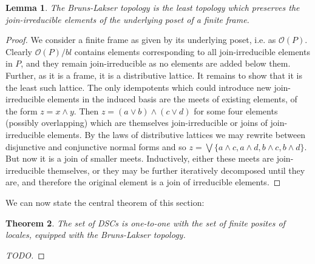 \documentclass[hoptionsi,review,format=acmsmall]{acmart}
\newtheorem{theorem}{Theorem}[section]
\newtheorem{lemma}[theorem]{Lemma}
\theoremstyle{definition}
\newcommand{\Oc}{\mathcal{O}}
\begin{document}
\begin{lemma}
The Bruns-Lakser topology is the least topology which preserves the join-irreducible elements of the underlying poset of a finite frame.
\end{lemma}
\begin{proof}
We consider a finite frame as given by its underlying poset, i.e. as \(\Oc(P)\). Clearly \(\Oc(P)/bl\) contains elements corresponding to all join-irreducible elements in \(P\), and they remain join-irreducible as no elements are added below them. Further, as it is a frame, it is a distributive lattice. It remains to show that it is the least such lattice. The only idempotents which could introduce new join-irreducible elements in the induced basis are the meets of existing elements, of the form  \(z = x \wedge y\). Then \(z = (a \vee b) \wedge (c \vee d)\) for some four elements (possibly overlapping) which are themselves join-irreducible or joins of join-irreducible elements.  By the laws of distributive lattices we may rewrite between disjunctive and conjunctive normal forms and so \(z = \bigvee \{a \wedge c, a \wedge d, b \wedge c, b \wedge d\}\).  But now it is a join of smaller meets. Inductively, either these meets are join-irreducible themselves, or they may be further iteratively decomposed until they are, and therefore the original element is a join of irreducible elements.
\end{proof}

We can now state the central theorem of this section:

\begin{theorem}
The set of DSCs is one-to-one with the set of finite posites of locales, equipped with the Bruns-Lakser topology.
\end{theorem}
\begin{proof}
[TODO]
\end{proof}






\end{document}
